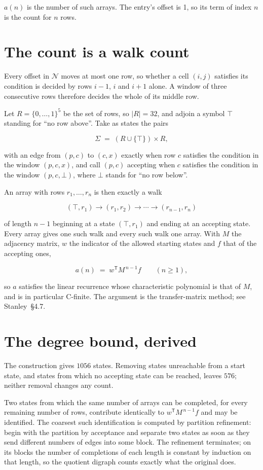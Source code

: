 \documentclass[11pt]{article}
\theoremstyle{definition}
\begin{document}
$a(n)$ is the number of such arrays. The entry's offset is 1, so its term of index $n$ is the count for $n$ rows.

\section{The count is a walk count}

Every offset in $\mathcal{N}$ moves at most one row, so whether a cell $(i,j)$ satisfies its condition is decided by rows $i-1$, $i$ and $i+1$ alone. A window of three consecutive rows therefore decides the whole of its middle row.

Let $R = \{0,\dots,1\}^{5}$ be the set of rows, so $|R| = 32$, and adjoin a symbol $\top$ standing for ``no row above''. Take as states the pairs

\[\Sigma \;=\; (R \cup \{\top\}) \times R,\]

with an edge from $(p,c)$ to $(c,x)$ exactly when row $c$ satisfies the condition in the window $(p,c,x)$, and call $(p,c)$ accepting when $c$ satisfies the condition in the window $(p,c,\bot)$, where $\bot$ stands for ``no row below''.

An array with rows $r_1,\dots,r_n$ is then exactly a walk

\[(\top,r_1) \to (r_1,r_2) \to \cdots \to (r_{n-1},r_n)\]

of length $n-1$ beginning at a state $(\top,r_1)$ and ending at an accepting state. Every array gives one such walk and every such walk one array. With $M$ the adjacency matrix, $w$ the indicator of the allowed starting states and $f$ that of the accepting ones,

\[a(n) \;=\; w^{\mathsf T} M^{\,n-1} f \qquad (n \ge 1),\]

so $a$ satisfies the linear recurrence whose characteristic polynomial is that of $M$, and is in particular C-finite. The argument is the transfer-matrix method; see Stanley~\S4.7.

\section{The degree bound, derived}

The construction gives $1056$ states. Removing states unreachable from a start state, and states from which no accepting state can be reached, leaves $576$; neither removal changes any count.

Two states from which the same number of arrays can be completed, for every remaining number of rows, contribute identically to $w^{\mathsf T}M^{\,n-1}f$ and may be identified. The coarsest such identification is computed by partition refinement: begin with the partition by acceptance and separate two states as soon as they send different numbers of edges into some block. The refinement terminates; on its blocks the number of completions of each length is constant by induction on that length, so the quotient digraph counts exactly what the original does.
\end{document}
